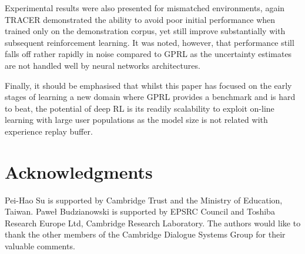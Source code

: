 \documentclass[11pt,a4paper]{article}
\begin{document}
Experimental results were also presented for mismatched environments, again TRACER demonstrated the ability to avoid poor initial performance when trained only on the demonstration corpus, yet still improve substantially with subsequent reinforcement learning. It was noted, however, that performance still falls off rather rapidly in noise compared to GPRL as the uncertainty estimates are not handled well by neural networks architectures.

Finally, it should be emphasised that whilst this paper has focused on the early stages of learning a new domain where GPRL provides a benchmark and is hard to beat, the potential of deep RL is its readily scalability to exploit on-line learning with large user populations as the model size is not related with experience replay buffer. 

\section*{Acknowledgments}
Pei-Hao Su is supported by Cambridge Trust and the Ministry of Education, Taiwan.
Pawe\l{} Budzianowski is supported by EPSRC Council and Toshiba Research Europe Ltd, Cambridge Research Laboratory.
The authors would like to thank the other members of the Cambridge Dialogue Systems Group for their valuable comments.



\end{document}
